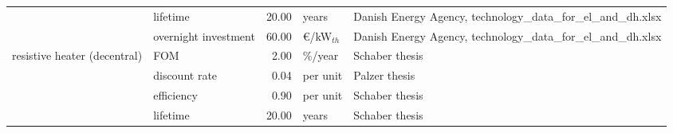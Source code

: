 \begin{longtable}{p{4cm}p{4cm}rp{3cm}p{10cm}}
                      & lifetime &        20.00 &                         years &                                                                                                                                                                                                                                                                        Danish Energy Agency, technology\_data\_for\_el\_and\_dh.xlsx \\
                      & overnight investment &        60.00 &               \euro/kW$_{th}$ &                                                                                                                                                                                                                                                                        Danish Energy Agency, technology\_data\_for\_el\_and\_dh.xlsx \\
resistive heater (decentral) & FOM &         2.00 &                       \%/year &                                                                                                                                                                                                                                                                                                                       Schaber thesis \\
                      & discount rate &         0.04 &                      per unit &                                                                                                                                                                                                                                                                                                                        Palzer thesis \\
                      & efficiency &         0.90 &                      per unit &                                                                                                                                                                                                                                                                                                                       Schaber thesis \\
                      & lifetime &        20.00 &                         years &                                                                                                                                                                                                                                                                                                                       Schaber thesis \\

\end{longtable}
